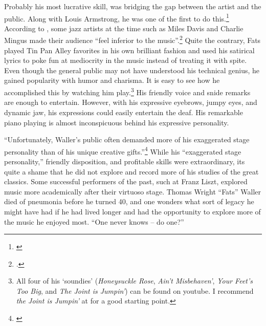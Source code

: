 \documentclass[11pt]{report}
\begin{document}
	\label{sec:charisma}
	Probably his most lucrative skill, was bridging the gap between the artist and the public. Along with Louis Armstrong, he was one of the first to do this.\footnote{\cite[3]{life}} According to \citeauthor{outside-insider}, some jazz artists at the time such as Miles Davis and Charlie Mingus made their audience ``feel inferior to the music''.\footnote{\cite[16]{outside-insider}.} Quite the contrary, Fats played Tin Pan Alley favorites in his own brilliant fashion and used his satirical lyrics to poke fun at mediocrity in the music instead of treating it with spite. Even though the general public may not have understood his technical genius, he gained popularity with humor and charisma. It is easy to see how he accomplished this by watching him play.\footnote{All four of his `soundies' (\emph{Honeysuckle Rose}, \emph{Ain't Misbehaven'}, \emph{Your Feet's Too Big}, and \emph{The Joint is Jumpin'}) can be found on youtube. I recommend \emph{the Joint is Jumpin'} at  for a good starting point.} His friendly voice and snide remarks are enough to entertain. However, with his expressive eyebrows, jumpy eyes, and dynamic jaw, his expressions could easily entertain the deaf. His remarkable piano playing is almost inconspicuous behind his expressive personality.


	\label{sec:conclusion}

	``Unfortunately, Waller's public often demanded more of his exaggerated stage personality than of his unique creative gifts.''\footnote{\cite[40]{grove-book:waller}} While his ``exaggerated stage personality,'' friendly disposition, and profitable skills were extraordinary, its quite a shame that he did not explore and record more of his studies of the great classics. Some successful performers of the past, such at Franz Liszt, explored music more academically after their virtuoso stage. Thomas Wright ``Fats'' Waller died of pneumonia before he turned 40, and one wonders what sort of legacy he might have had if he had lived longer and had the opportunity to explore more of the music he enjoyed most. ``One never knows -- do one?''




		\nocite{anecdotes}
		\nocite{experience}
		\nocite{grove-book:waller}
		\nocite{jazz_scene}
		\nocite{life}
		\nocite{modernism}
		\nocite{outside-insider}
		\nocite{transcriptions}
		\nocite{visions}
		\nocite{web:machlin}
		\nocite{web:stride}
		\nocite{youtube-joint_is_jumpin}
			\printbibliography
\end{document}
